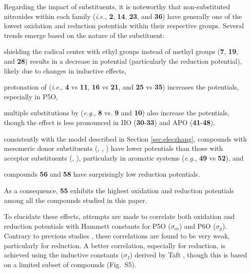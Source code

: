 \documentclass[review,preprint]{elsarticle}
\begin{document}
Regarding the impact of substituents, it is noteworthy that non-substituted nitroxides within each family (\textit{i.e.}, \textbf{2}, \textbf{14}, \textbf{23}, and \textbf{36}) have generally one of the lowest oxidation and reduction potentials within their respective groups. Several trends emerge based on the nature of the substituent: \begin{inparaenum}[(i)]
	\item shielding the radical center with ethyl groups instead of methyl groups (\textbf{7}, \textbf{19}, and \textbf{28}) results in a decrease in potential (particularly the reduction potential), likely due to changes in inductive effects,
	\item protonation of  (\textit{i.e.}, \textbf{4} vs \textbf{11}, \textbf{16} vs \textbf{21}, and \textbf{25} vs \textbf{35}) increases the potentials, especially in P5O,
	\item multiple substitutions by  (\textit{e.g.}, \textbf{8} vs. \textbf{9} and \textbf{10}) also increase the potentials, though the effect is less pronounced in IIO (\textbf{30}-\textbf{33}) and APO (\textbf{41}-\textbf{48}),
	\item consistently with the model described in Section \ref{sec:eleczhang}, compounds with mesomeric donor substituents (, , ) have lower potentials than those with acceptor substituents (, ), particularly in aromatic systems (\textit{e.g.}, \textbf{49} vs \textbf{52}), and
	\item compounds \textbf{56} and \textbf{58} have surprisingly low reduction potentials.
\end{inparaenum}
As a consequence, \textbf{55} exhibits the highest oxidation and reduction potentials among all the compounds studied in this paper.

To elucidate these effects, attempts are made to correlate both oxidation and reduction potentials with Hammett constants for P5O ($\sigma_m$) and P6O ($\sigma_p$). Contrary to previous studies \cite{hodgsonOneElectronOxidationReduction2007,zhangEffectHeteroatomFunctionality2018}, these correlations are found to be very weak, particularly for reduction. A better correlation, especially for reduction, is achieved using the inductive constants ($\sigma_I$) derived by Taft \cite{hanschSurveyHammettSubstituent1991}, though this is based on a limited subset of compounds (Fig.~S5).
\end{document}
